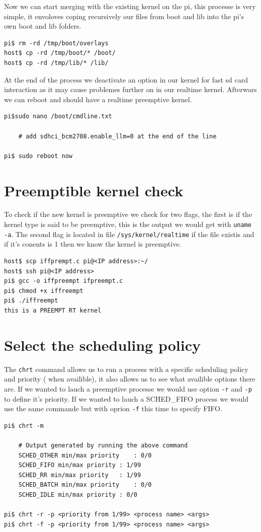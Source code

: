 \documentclass[a4paper,oneside,onecolumn]{article}
\newcommand{\code}[1]{\colorbox{codegray}{\texttt{#1}}}
\begin{document}
Now we can start merging with the existing kernel on the pi, this processe is very simple, it envoloves coping recursively our files from boot and lib into the pi's own boot and lib folders.
\begin{lstlisting}
pi$ rm -rd /tmp/boot/overlays
host$ cp -rd /tmp/boot/* /boot/
host$ cp -rd /tmp/lib/* /lib/
\end{lstlisting}
At the end of the process we deactivate an option in our kernel for fast sd card interaction as it may cause problemes further on in our realtime kernel. Afterwars we can reboot and should have a realtime preemptive kernel.\newline
\begin{lstlisting}
pi$sudo nano /boot/cmdline.txt 

	# add sdhci_bcm2708.enable_llm=0 at the end of the line

pi$ sudo reboot now
\end{lstlisting}

\section{Preemptible kernel check}
To check if the new kernel is preemptive we check for two flags, the first is if the kernel type is said to be preemptive, this is the output we would get with \code{uname -a}. The second flag is located in file \code{/sys/kernel/realtime} if the file existis and if it's conents is 1 then we know the kernel is preemptive.
\begin{lstlisting}
host$ scp iffprempt.c pi@<IP address>:~/
host$ ssh pi@<IP address>
pi$ gcc -o iffpreempt ifpreempt.c
pi$ chmod +x iffreempt
pi$ ./iffreempt
this is a PREEMPT RT kernel
\end{lstlisting}
\section{Select the scheduling policy}
The \code{chrt} command allows us to run a process with a specific scheduling policy and priority ( when availible), it also allows us to see what availible options there are. If we wanted to lauch a preemptive processe we would use option \code{-r} and \code{-p} to define it's priority.\newline
If we wanted to lauch a SCHED\_FIFO process we would use the same commande but with oprion \code{-f} this time to specify FIFO.
\begin{lstlisting}
pi$ chrt -m

	# Output generated by running the above command
	SCHED_OTHER min/max priority	: 0/0
	SCHED_FIFO min/max priority	: 1/99
	SCHED_RR min/max priority	: 1/99
	SCHED_BATCH min/max priority	: 0/0
	SCHED_IDLE min/max priority	: 0/0

pi$ chrt -r -p <priority from 1/99> <process name> <args>
pi$ chrt -f -p <priority from 1/99> <process name> <args>
\end{lstlisting}
\end{document}
